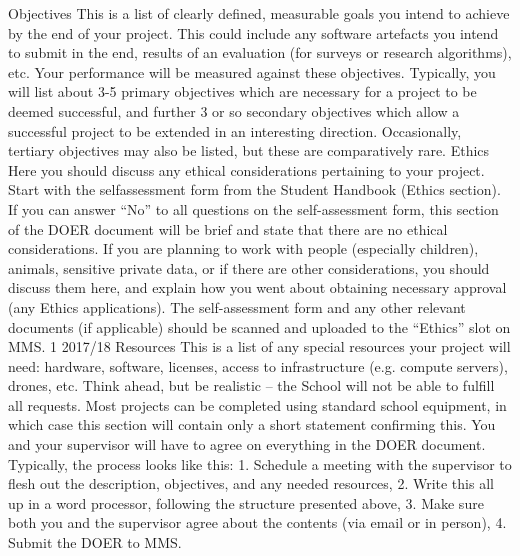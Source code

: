 \documentclass[12pt,a4paper,notitlepage]{report}
\begin{document}
Objectives
This is a list of clearly defined, measurable goals you
intend to achieve by the end of your project. This could
include any software artefacts you intend to submit in
the end, results of an evaluation (for surveys or research
algorithms), etc. Your performance will be measured
against these objectives.
Typically, you will list about 3-5 primary objectives
which are necessary for a project to be deemed
successful, and further 3 or so secondary objectives
which allow a successful project to be extended in an
interesting direction. Occasionally, tertiary objectives
may also be listed, but these are comparatively rare.
Ethics
Here you should discuss any ethical considerations
pertaining to your project. Start with the selfassessment form from the Student Handbook (Ethics
section). If you can answer “No” to all questions on the
self-assessment form, this section of the DOER
document will be brief and state that there are no ethical
considerations.
If you are planning to work with people (especially
children), animals, sensitive private data, or if there are
other considerations, you should discuss them here, and
explain how you went about obtaining necessary
approval (any Ethics applications).
The self-assessment form and any other relevant
documents (if applicable) should be scanned and
uploaded to the “Ethics” slot on MMS.
1
2017/18
Resources
This is a list of any special resources your project will
need: hardware, software, licenses, access to
infrastructure (e.g. compute servers), drones, etc. Think
ahead, but be realistic -- the School will not be able to
fulfill all requests.
Most projects can be completed using standard school
equipment, in which case this section will contain only a
short statement confirming this.
You and your supervisor will have to agree on everything in the DOER document.
Typically, the process looks like this:
1. Schedule a meeting with the supervisor to flesh out the description,
objectives, and any needed resources,
2. Write this all up in a word processor, following the structure presented
above,
3. Make sure both you and the supervisor agree about the contents (via email
or in person),
4. Submit the DOER to MMS.
\end{document}
